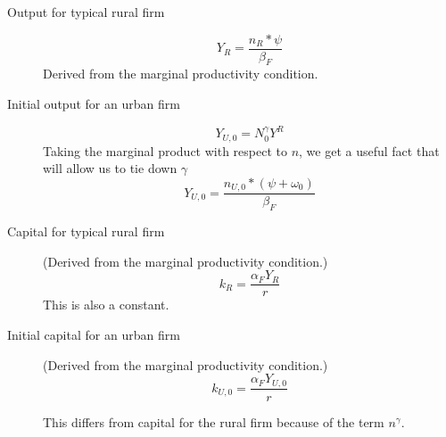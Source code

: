 \begin{description}


\item[Output for typical rural firm]  
\begin{equation}Y_R=\frac{n_R*\psi}{\beta_F}\label{eqn_Rural_output}\end{equation}
Derived from the marginal productivity condition.


\item[Initial output for an urban firm] 
\[Y_{U, 0} = N_0^\gamma Y^R\]  
Taking the marginal product with respect to $n$, we get a useful fact that will allow us to tie down $\gamma$
\[Y_{U,0} = \frac{n_{U,0}*(\psi+\omega_0)}{\beta_F}\]

\item[Capital for typical rural firm] (Derived from the marginal productivity condition.)
\[k_R=  \frac{\alpha_F Y_R }{r}\]
This is also a constant.
 
\item[Initial capital for an urban firm] (Derived from the marginal productivity condition.)
\[k_{U,0}=  \frac{\alpha_F Y_{U,0} }{r}\]


This differs from capital  for the rural firm because of the term $n^\gamma$. 


\end{description}
